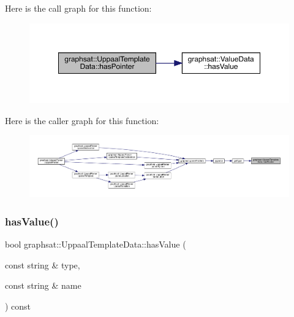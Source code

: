 Here is the call graph for this function\+:
\nopagebreak
\begin{figure}[H]
\begin{center}
\leavevmode
\includegraphics[width=350pt]{classgraphsat_1_1_uppaal_template_data_a504ceabe99897f4e43877d3c2dbf0c46_cgraph}
\end{center}
\end{figure}
Here is the caller graph for this function\+:
\nopagebreak
\begin{figure}[H]
\begin{center}
\leavevmode
\includegraphics[width=350pt]{classgraphsat_1_1_uppaal_template_data_a504ceabe99897f4e43877d3c2dbf0c46_icgraph}
\end{center}
\end{figure}
\mbox{\label{classgraphsat_1_1_uppaal_template_data_a72b77355129690fecd51e9641923d4e0}} 
\subsubsection{\texorpdfstring{hasValue()}{hasValue()}}
{\footnotesize\ttfamily bool graphsat\+::\+Uppaal\+Template\+Data\+::has\+Value (\begin{DoxyParamCaption}\item[{const string \&}]{type,  }\item[{const string \&}]{name }\end{DoxyParamCaption}) const\hspace{0.3cm}{\ttfamily [inline]}}

